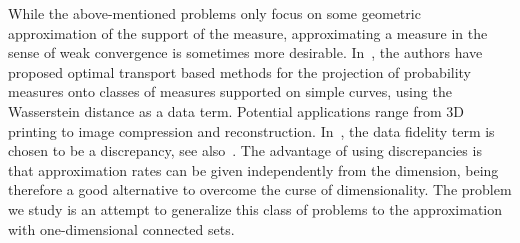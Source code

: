 \documentclass[11pt]{article}
\numberwithin{equation}{section}
\theoremstyle{definition}
\begin{document}
While the above-mentioned problems only focus on some geometric approximation of the support of the measure, approximating a measure in the sense of weak convergence is sometimes more desirable. In~\cite{lebrat2019optimal,chauffert2017projection}, the authors have proposed optimal transport based methods for the projection of probability measures onto classes of measures supported on simple curves, using the Wasserstein distance as a data term. Potential applications range from 3D printing to image compression and reconstruction.
In~\cite{ehler2021curve}, the data fidelity term is chosen to be a discrepancy, see
also~\cite{neumayer2021optimal}. The advantage of using discrepancies is that approximation rates can be given independently from the dimension, being therefore a good alternative to overcome the curse of dimensionality. The problem we study is an attempt to generalize this class of problems
to the approximation with one-dimensional connected sets.
\end{document}
